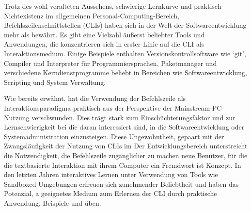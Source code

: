 \begin{zusammenfassung}
\sloppy

Trotz des wohl veralteten Aussehens, schwierige Lernkurve und praktisch
Nichtexistenz im allgemeinen Personal-Computing-Bereich,
Befehlszeilenschnittstellen (CLIs) haben sich in der Welt der
Softwareentwicklung mehr als bewährt. Es gibt eine Vielzahl äußerst beliebter
Tools und Anwendungen, die konzentrieren sich in erster Linie auf die CLI als
Interaktionsmedium. Einige Beispiele enthalten Versionskontrollsoftware wie
`git', Compiler und Interpreter für Programmiersprachen, Paketmanager und
verschiedene Kerndienstprogramme beliebt in Bereichen wie Softwareentwicklung,
Scripting und System Verwaltung.

Wie bereits erwähnt, hat die Verwendung der Befehlszeile als
Interaktionsparadigma praktisch aus der Perspektive der Mainstream-PC-Nutzung
verschwunden. Dies trägt stark zum Einschüchterungsfaktor und zur
Lernschwierigkeit bei die daran interessiert sind, in die Softwareentwicklung
oder Systemadministration einzusteigen. Diese Ungewohntheit, gepaart mit der
Zwangsläufigkeit der Nutzung von CLIs im Der Entwicklungsbereich unterstreicht
die Notwendigkeit, die Befehlszeile zugänglicher zu machen neue Benutzer, für
die die textbasierte Interaktion mit ihrem Computer ein Fremdwort ist Konzept.
In den letzten Jahren interaktives Lernen unter Verwendung von Tools wie
Sandboxed Umgebungen erfreuen sich zunehmender Beliebtheit und haben das
Potenzial, a geeignetes Medium zum Erlernen der CLI durch praktische Anwendung,
Beispiele und üben.

\end{zusammenfassung}
